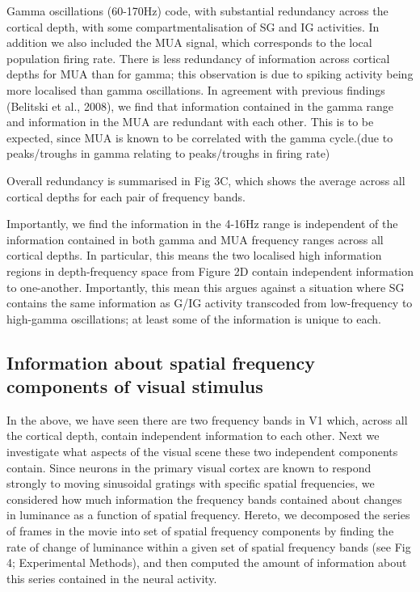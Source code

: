 Gamma oscillations (60-170Hz) code, with substantial redundancy across the cortical depth, with some compartmentalisation of \ac{SG} and \ac{IG} activities. In addition we also included the \ac{MUA} signal, which corresponds to the local population firing rate. There is less redundancy of information across cortical depths for \ac{MUA} than for gamma; this observation is due to spiking activity being more localised than gamma oscillations. In agreement with previous findings (Belitski et al., 2008), we find that information contained in the gamma range and information in the \ac{MUA} are redundant with each other. This is to be expected, since \ac{MUA} is known to be correlated with the gamma cycle.(due to peaks/troughs in gamma relating to peaks/troughs in firing rate)

Overall redundancy is summarised in Fig 3C, which shows the average across all cortical depths for each pair of frequency bands.

Importantly, we find the information in the 4-16Hz range is independent of the information contained in both gamma and \ac{MUA} frequency ranges across all cortical depths. In particular, this means the two localised high information regions in depth-frequency space from Figure 2D contain independent information to one-another. Importantly, this mean this argues against a situation where \ac{SG} contains the same information as \ac{G}/\ac{IG} activity transcoded from low-frequency to high-gamma oscillations; at least some of the information is unique to each.

\subsection{Information about spatial frequency components of visual stimulus}
In the above, we have seen there are two frequency bands in \ac{V1} which, across all the cortical depth, contain independent information to each other. Next we investigate what aspects of the visual scene these two independent components contain. Since neurons in the primary visual cortex are known to respond strongly to moving sinusoidal gratings with specific spatial frequencies, we considered how much information the frequency bands contained about changes in luminance as a function of spatial frequency. Hereto, we decomposed the series of frames in the movie into set of spatial frequency components by finding the rate of change of luminance within a given set of spatial frequency bands (see Fig 4; Experimental Methods), and then computed the amount of information about this series contained in the neural activity.

